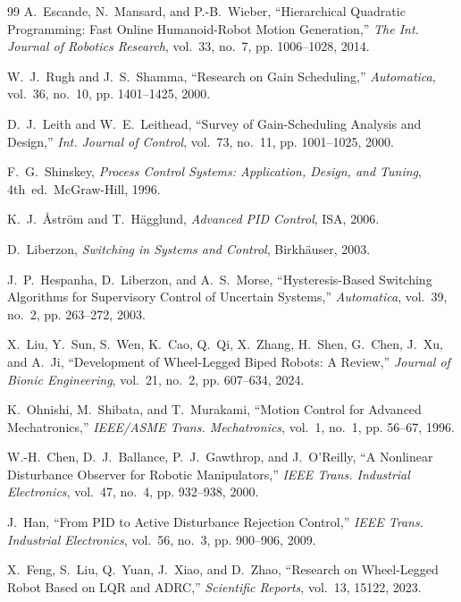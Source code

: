 \documentclass[conference]{IEEEtran}
\begin{document}
\begin{thebibliography}{99}
A.~Escande, N.~Mansard, and P.-B.~Wieber,
``Hierarchical Quadratic Programming: Fast Online Humanoid-Robot Motion Generation,''
\emph{The Int. Journal of Robotics Research}, vol.~33, no.~7, pp. 1006--1028, 2014.

W.~J.~Rugh and J.~S.~Shamma,
``Research on Gain Scheduling,''
\emph{Automatica}, vol.~36, no.~10, pp. 1401--1425, 2000.

D.~J.~Leith and W.~E.~Leithead,
``Survey of Gain-Scheduling Analysis and Design,''
\emph{Int. Journal of Control}, vol.~73, no.~11, pp. 1001--1025, 2000.

F.~G.~Shinskey,
\emph{Process Control Systems: Application, Design, and Tuning}, 4th~ed.\ McGraw-Hill, 1996.

K.~J.~\AA{}str\"{o}m and T.~H\"{a}gglund,
\emph{Advanced PID Control}, ISA, 2006.

D.~Liberzon,
\emph{Switching in Systems and Control},
Birkh\"{a}user, 2003.

J.~P.~Hespanha, D.~Liberzon, and A.~S.~Morse,
``Hysteresis-Based Switching Algorithms for Supervisory Control of Uncertain Systems,''
\emph{Automatica}, vol.~39, no.~2, pp. 263--272, 2003.

X.~Liu, Y.~Sun, S.~Wen, K.~Cao, Q.~Qi, X.~Zhang, H.~Shen, G.~Chen, J.~Xu, and A.~Ji,
``Development of Wheel-Legged Biped Robots: A Review,''
\emph{Journal of Bionic Engineering}, vol.~21, no.~2, pp. 607--634, 2024.

K.~Ohnishi, M.~Shibata, and T.~Murakami,
``Motion Control for Advanced Mechatronics,''
\emph{IEEE/ASME Trans. Mechatronics}, vol.~1, no.~1, pp. 56--67, 1996.

W.-H.~Chen, D.~J.~Ballance, P.~J.~Gawthrop, and J.~O'Reilly,
``A Nonlinear Disturbance Observer for Robotic Manipulators,''
\emph{IEEE Trans. Industrial Electronics}, vol.~47, no.~4, pp. 932--938, 2000.

J.~Han,
``From PID to Active Disturbance Rejection Control,''
\emph{IEEE Trans. Industrial Electronics}, vol.~56, no.~3, pp. 900--906, 2009.

X.~Feng, S.~Liu, Q.~Yuan, J.~Xiao, and D.~Zhao,
``Research on Wheel-Legged Robot Based on LQR and ADRC,''
\emph{Scientific Reports}, vol.~13, 15122, 2023.


\end{thebibliography}
\end{document}
